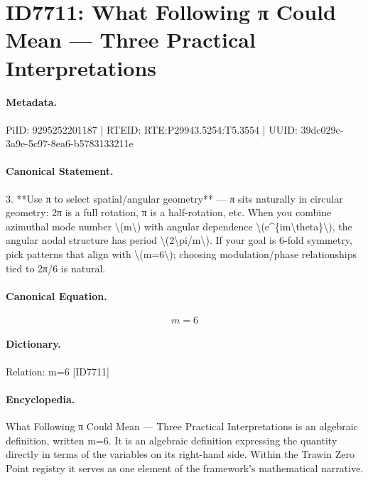\section*{ID7711: What Following π Could Mean — Three Practical Interpretations}
\paragraph{Metadata.}
PiID: 9295252201187 | RTEID: RTE:P29943.5254:T5.3554 | UUID: 39dc029c-3a9e-5c97-8ea6-b5783133211e

\paragraph{Canonical Statement.}
3. **Use π to select spatial/angular geometry** — π sits naturally in circular geometry: 2π is a full rotation, π is a half-rotation, etc. When you combine azimuthal mode number \textbackslash{}(m\textbackslash{}) with angular dependence \textbackslash{}(e\textasciicircum{}\{im\textbackslash{}theta\}\textbackslash{}), the angular nodal structure has period \textbackslash{}(2\textbackslash{}pi/m\textbackslash{}). If your goal is 6-fold symmetry, pick patterns that align with \textbackslash{}(m=6\textbackslash{}); choosing modulation/phase relationships tied to 2π/6 is natural.

\paragraph{Canonical Equation.}
\[
m=6
\]

\paragraph{Dictionary.}
Relation: m=6 [ID7711]

\paragraph{Encyclopedia.}
What Following π Could Mean — Three Practical Interpretations is an algebraic definition, written m=6. It is an algebraic definition expressing the quantity directly in terms of the variables on its right-hand side. Within the Trawin Zero Point registry it serves as one element of the framework's mathematical narrative.

